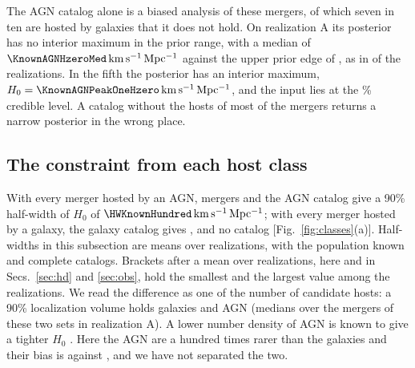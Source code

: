 \documentclass[aps,prd,reprint,twocolumn,superscriptaddress,nofootinbib,floatfix,nolongbibliography]{revtex4-2}
\newcommand{\kms}{{\rm km\,s^{-1}\,Mpc^{-1}}}
\begin{document}
The AGN catalog alone is a biased analysis of these mergers, of which seven
in ten are hosted by galaxies that it does not hold. On realization A its
posterior has no interior maximum in the prior range, with a median of
$\KnownAGNHzeroMed\,\kms$ against the upper prior edge of \PriorHzeroHi, as
in \KnownAGNNoPeak{} of the \NrealKnownAlone{} realizations. In the fifth the
posterior has an interior maximum, $H_0=\KnownAGNPeakOneHzero\,\kms$, and the
input lies at the \KnownAGNPeakOneHzeroCL\% credible level. A catalog without
the hosts of most of the mergers returns a narrow posterior in the wrong
place.

\subsection{The constraint from each host class}
\label{sec:classes}

With every merger hosted by an AGN, \MockNev{} mergers and the AGN catalog
give a 90\% half-width of $H_0$ of $\HWKnownHundred\,\kms$; with every merger
hosted by a galaxy, the galaxy catalog gives \HWKnownZero, and no catalog
\HWNone{} [Fig.~\ref{fig:classes}(a)]. Half-widths in this subsection are
means over \NrealClasses{} realizations, with the population known and
complete catalogs. Brackets after a mean over realizations, here and in
Secs.~\ref{sec:hd} and \ref{sec:obs}, hold the smallest and the largest
value among the realizations. We read the difference as one of the
number of candidate hosts: a 90\% localization volume holds
\PureGalHostsPerVol{} galaxies and \PureAGNHostsPerVol{} AGN (medians over
the mergers of these two sets in realization A). A lower number density of
AGN is known to give a tighter $H_0$ \cite{Bom:2023zgw}. Here the AGN are a
hundred times rarer than the galaxies and their bias is \MockbAGN{} against
\MockbGal, and we have not separated the two.
\end{document}
